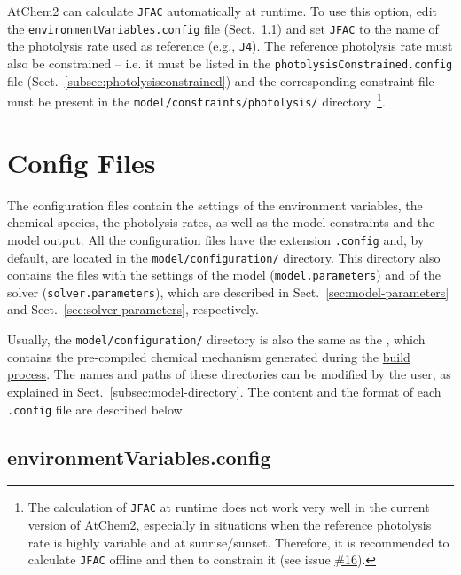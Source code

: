 AtChem2 can calculate \texttt{JFAC} automatically at runtime. To use
this option, edit the \texttt{environmentVariables.config} file
(Sect.~\ref{subsec:environmentvariables}) and set \texttt{JFAC} to the
name of the photolysis rate used as reference (e.g., \texttt{J4}).
The reference photolysis rate must also be constrained -- i.e. it must
be listed in the \texttt{photolysisConstrained.config} file
(Sect.~\ref{subsec:photolysisconstrained}) and the corresponding
constraint file must be present in the \texttt{model/constraints/photolysis/}
directory~\footnote{The calculation of \texttt{JFAC} at runtime does
  not work very well in the current version of AtChem2, especially in
  situations when the reference photolysis rate is highly variable and
  at sunrise/sunset. Therefore, it is recommended to calculate
  \texttt{JFAC} offline and then to constrain it (see issue
  \href{https://github.com/AtChem/AtChem2/issues/16}{\#16}).}.

\section{Config Files} \label{sec:config-files}

The configuration files contain the settings of the environment
variables, the chemical species, the photolysis rates, as well as the
model constraints and the model output. All the configuration files
have the extension \texttt{.config} and, by default, are located in
the \texttt{model/configuration/} directory. This directory also contains
the files with the settings of the model (\texttt{model.parameters})
and of the solver (\texttt{solver.parameters}), which are described in
Sect.~\ref{sec:model-parameters} and Sect.~\ref{sec:solver-parameters},
respectively.

Usually, the \texttt{model/configuration/} directory is also the same
as the \sharedir, which contains the pre-compiled chemical mechanism
generated during the \hyperref[subsec:build-process]{build process}.
The names and paths of these directories can be modified by the user,
as explained in Sect.~\ref{subsec:model-directory}. The content and
the format of each \texttt{.config} file are described below.

\subsection{environmentVariables.config} \label{subsec:environmentvariables}

